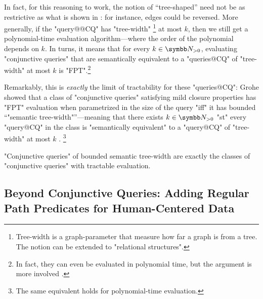 In fact, for this reasoning to work, the notion of ``tree-shaped'' need not
be as restrictive as what is shown in : for instance,
edges could be reversed. More generally, if the "query@@CQ" has "tree-width"%
\footnote{Tree-width is a graph-parameter that measure how far a graph is from a tree.
The notion can be extended to "relational structures".}
at most $k$, then we still get a polynomial-time evaluation algorithm---where the order
of the polynomial depends on $k$. In turns, it means that for every $k\in\Np$,
evaluating "conjunctive queries" that are semantically equivalent to
a "queries@CQ" of "tree-width" at most $k$ is "FPT".\footnote{In fact,
they can even be evaluated in polynomial time, but the argument is more involved
\cite{ChekuriRajaraman2000TreeWidthPolytime}.}

Remarkably, this is \emph{exactly} the limit of tractability for these "queries@CQ":
Grohe showed that a class of "conjunctive queries"
satisfying mild closure properties has "FPT" evaluation when parametrized in the size
of the query "iff"
it has bounded ``"semantic tree-width"''---meaning that there exists $k\in\Np$ "st"
every "query@CQ" in the class is "semantically equivalent" to a "query@CQ" 
of "tree-width" at most $k$ \cite{Grohe2007ComplexityHomomorphism}.%
\footnote{The same equivalent holds for polynomial-time evaluation.}

\begin{known}
	"Conjunctive queries" of bounded semantic tree-width are exactly
	the classes of "conjunctive queries" with tractable evaluation.
\end{known}


\subsection{Beyond Conjunctive Queries: Adding Regular Path Predicates for Human-Centered Data}

